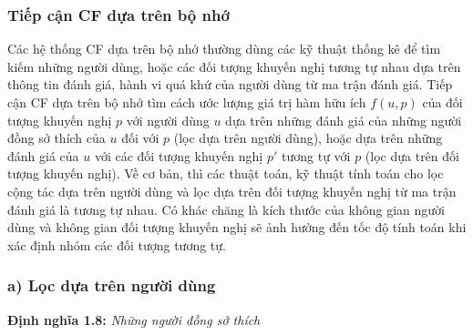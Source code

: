 \subsubsection{Tiếp cận CF dựa trên bộ nhớ}
Các hệ thống CF dựa trên bộ nhớ thường dùng các kỹ thuật thống kê để tìm kiếm những người dùng, hoặc các đối tượng khuyến nghị tương tự nhau dựa trên thông tin đánh giá, hành vi quá khứ của người dùng từ ma trận đánh giá. Tiếp cận CF dựa trên bộ nhớ tìm cách ước lượng giá trị hàm hữu ích $f(u,p)$ của đối tượng khuyến nghị $p$ với người dùng $u$ dựa trên những đánh giá của những người đồng sở thích của $u$ đối với $p$ (lọc dựa trên người dùng), hoặc dựa trên những đánh giá của $u$ với các đối tượng khuyến nghị $p'$ tương tự với $p$ (lọc dựa trên đối tượng khuyến nghị). Về cơ bản, thì các thuật toán, kỹ thuật tính toán cho lọc cộng tác dựa trên người dùng và lọc dựa trên đối tượng khuyến nghị từ ma trận đánh giá là tương tự nhau. Có khác chăng là kích thước của không gian người dùng và không gian đối tượng khuyến nghị sẽ ảnh hưởng đến tốc độ tính toán khi xác định nhóm các đối tượng tương tự.

\subsubsection*{a) Lọc dựa trên người dùng}
\textbf{Định nghĩa 1.8:} \textit{Những người đồng sở thích}

